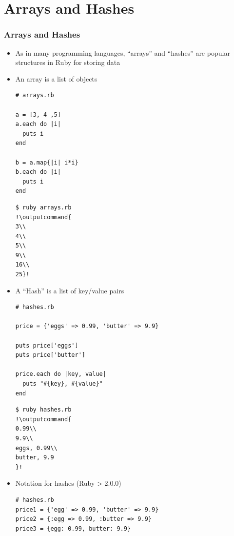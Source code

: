 \documentclass{beamer}
\newcommand{\outputcommand}[1]{\color{darkgreen}{#1}}
\begin{document}
\section{Arrays and Hashes}
\begin{frame}
\frametitle{Arrays and Hashes}
\begin{itemize}
 \item As in many programming languages, ``arrays'' and ``hashes'' are popular structures in Ruby for storing data
 \item An array is a list of objects 
\lstset{language=Ruby, style=eclipse}
\begin{lstlisting}[escapechar=&]
# arrays.rb

a = [3, 4 ,5]
a.each do |i|
  puts i
end

b = a.map{|i| i*i}
b.each do |i|
  puts i
end
\end{lstlisting}

\lstset{language=shell}
\begin{lstlisting}[numbers=none, escapechar=!]
$ ruby arrays.rb
!\outputcommand{
3\\
4\\
5\\
9\\
16\\
25}!
\end{lstlisting}
 \item A ``Hash'' is a list of key/value pairs
\lstset{language=Ruby, style=eclipse}
\begin{lstlisting}[escapechar=&]
# hashes.rb

price = {'eggs' => 0.99, 'butter' => 9.9}

puts price['eggs']
puts price['butter']

price.each do |key, value|
  puts "#{key}, #{value}"
end
\end{lstlisting}

\lstset{language=shell}
\begin{lstlisting}[numbers=none, escapechar=!]
$ ruby hashes.rb
!\outputcommand{
0.99\\
9.9\\
eggs, 0.99\\
butter, 9.9
}!
\end{lstlisting}

\item Notation for hashes (Ruby > 2.0.0)
\lstset{language=Ruby, style=eclipse}
\begin{lstlisting}[escapechar=&]
# hashes.rb
price1 = {'egg' => 0.99, 'butter' => 9.9}
price2 = {:egg => 0.99, :butter => 9.9}
price3 = {egg: 0.99, butter: 9.9}


\end{lstlisting}
\end{itemize}
\end{frame}
\end{document}
